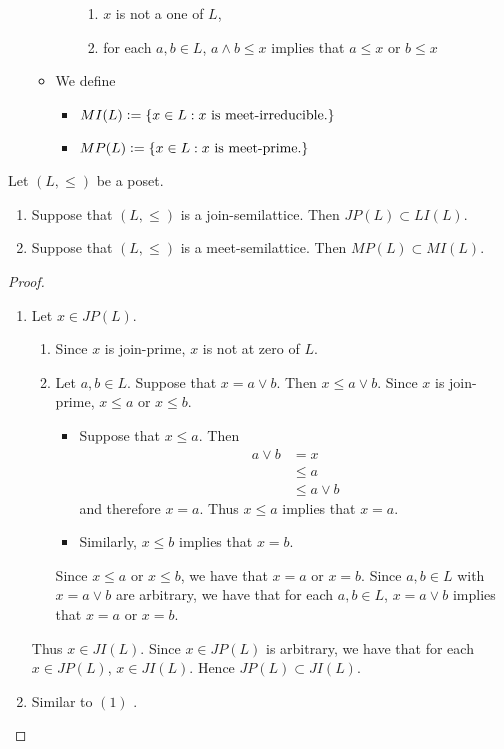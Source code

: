 \documentclass{book}
\begin{document}
\begin{defn}
\begin{itemize}
\begin{itemize}
\begin{itemize}
\begin{enumerate}
						\item $x$ is not a one of $L$,
						\item for each $a,b \in L$, $a \wedge b \leq x$ implies that $a \leq x$ or $b \leq x$
					\end{enumerate}
				\end{itemize}
				\item We define 
				\begin{itemize}
					\item $MI(L) \vcentcolon= \{x \in L: \text{$x$ is meet-irreducible.}\}$
					\item $MP(L) \vcentcolon= \{x \in L: \text{$x$ is meet-prime.}\}$
				\end{itemize}
			\end{itemize}
		\end{itemize}
	\end{defn}
	
	\begin{ex}
		Let $(L, \leq)$ be a poset. 
		\begin{enumerate}
			\item Suppose that $(L, \leq)$ is a join-semilattice. Then $JP(L) \subset LI(L)$. 
			\item Suppose that $(L, \leq)$ is a meet-semilattice. Then $MP(L) \subset MI(L)$. 
		\end{enumerate}
	\end{ex}
	
	\begin{proof}\
		\begin{enumerate}
			\item Let $x \in JP(L)$.
			\begin{enumerate}
				\item Since $x$ is join-prime, $x$ is not at zero of $L$.
				\item Let $a,b \in L$. Suppose that $x = a \vee b$. Then $x \leq a \vee b$. Since $x$ is join-prime, $x \leq a$ or $x \leq b$. 
				\begin{itemize}
					\item Suppose that $x \leq a$. Then 
					\begin{align*}
						a \vee b
						& = x \\
						& \leq a \\
						& \leq a \vee b
					\end{align*}
					and therefore $x = a$. Thus $x \leq a$ implies that $x = a$.
					\item Similarly, $x \leq b$ implies that $x = b$. 
				\end{itemize}
				Since $x \leq a$ or $x \leq b$, we have that $x = a$ or $x = b$. Since $a,b \in L$ with $x = a \vee b$ are arbitrary, we have that for each $a,b \in L$, $x = a \vee b$ implies that $x = a$ or $x = b$.
			\end{enumerate} 
			Thus $x \in JI(L)$. Since $x \in JP(L)$ is arbitrary, we have that for each $x \in JP(L)$, $x \in JI(L)$. Hence $JP(L) \subset JI(L)$.
			\item Similar to $(1)$ \tcr{use duality}. 
		\end{enumerate}
	\end{proof}
	
\end{document}
